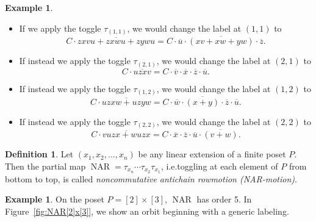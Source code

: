 \documentclass[10pt]{amsart}
\theoremstyle{definition}
\newtheorem{defi}[theo]{Definition}
\newtheorem{exam}[theo]{Example}
\newcommand{\ie}{i.e.}
\newcommand{\defn}[1]{\emph{#1}}
\DeclareMathOperator{\NAR}{NAR}
\begin{document}
\begin{exam}
\begin{itemize}
\item If we apply the toggle $\tau_{(1,1)}$,
we would change the label at $(1,1)$ to
\[
C\cdot \overline{zxvu+zxwu+zywu}=
C\cdot \overline{u}\cdot\overline{(xv+xw+yw)}
\cdot\overline{z}.
\]
\item If instead we apply the toggle $\tau_{(2,1)}$,
we would change the label at $(2,1)$ to
\[
C\cdot \overline{uzxv}
=C\cdot \overline{v}\cdot \overline{x}\cdot \overline{z}\cdot \overline{u}.
\]
\item If instead we apply the toggle $\tau_{(1,2)}$,
we would change the label at $(1,2)$ to
\[
C\cdot \overline{uzxw+uzyw}
=C\cdot \overline{w}\cdot \overline{(x+y)}\cdot \overline{z}\cdot \overline{u}.
\]
\item If instead we apply the toggle $\tau_{(2,2)}$,
we would change the label at $(2,2)$ to
\[
C\cdot \overline{vuzx+wuzx}
=C\cdot \overline{x}\cdot \overline{z}\cdot \overline{u}\cdot \overline{(v+w)}.
\]
\end{itemize}
\end{exam}

\begin{defi}
Let $(x_1,x_2,\dots,x_n)$ be any linear extension of a finite poset $P$. Then the partial map $\NAR=\tau_{x_n}\cdots \tau_{x_2} \tau_{x_1}$, \ie toggling at each element of $P$
from bottom to top, is called \defn{noncommutative antichain rowmotion (NAR-motion)}.
\end{defi}

\begin{exam}\label{ex:NAR[2]x[3]}
On the poset $P=[2]\times[3]$, $\NAR$ has order 5.
In Figure~\ref{fig:NAR[2]x[3]}, we show an orbit beginning with a generic labeling.
\end{exam}
\end{document}
